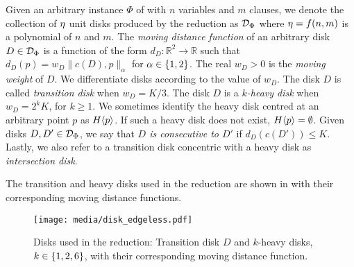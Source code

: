 \begin{toappendix}
\begin{toappendix}
Given an arbitrary instance $\Phi$ of {\pthreesat} with $n$ variables and $m$ clauses, we denote the collection of $\eta$ unit disks produced by the reduction as $\mathcal{D}_\Phi$ where $\eta = f(n,m)$ is a polynomial of $n$ and $m$.
The \emph{moving distance function} of an arbitrary disk $D \in \mathcal{D}_\Phi$ is a function of the form $d_{D}:\mathbb{R}^2 \rightarrow \mathbb{R}$ such that $d_{D}(p) = w_D\lVert c(D),p \rVert_\alpha$ for $\alpha \in \{1,2\}$. The real $w_D >0$ is the \emph{moving weight} of $D$.
We differentiate disks according to the value of $w_D$.
The disk $D$ is called \emph{transition disk} when $w_D = K/3$.
The disk $D$ is a \emph{$k$-heavy disk} when $w_D = 2^kK$, for $k\ge 1$.
We sometimes identify the heavy disk centred at an arbitrary point $p$ as $H\langle p\rangle$.
If such a heavy disk does not exist, $H\langle p\rangle = \emptyset$.
Given disks $D,D' \in \mathcal{D}_\Phi$, we say that \emph{$D$ is consecutive to $D'$} if $d_D(c(D')) \le K$.
Lastly, we also refer to a transition disk concentric with a heavy disk as \emph{intersection disk}.

The transition and heavy disks used in the reduction are shown in  with their corresponding moving distance functions.

\begin{figure}[!htb]
    \centering
    \texttt{[image: media/disk\_edgeless.pdf]}
    \caption{Disks used in the reduction: Transition disk $D$ and $k$-heavy disks, $k \in\{1,2,6\}$, with their corresponding moving distance function.}
    \label{fig:md_functions}
\end{figure}


\end{toappendix}
\end{toappendix}
